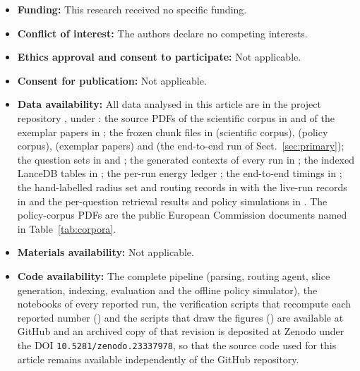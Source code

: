 \documentclass[pdflatex,sn-mathphys-num]{sn-jnl}
\theoremstyle{thmstyleone}%
\theoremstyle{thmstylethree}%
\begin{document}
\begin{itemize}
\item \textbf{Funding:} This research received no specific funding.
\item \textbf{Conflict of interest:} The authors declare no competing interests.
\item \textbf{Ethics approval and consent to participate:} Not applicable.
\item \textbf{Consent for publication:} Not applicable.
\item \textbf{Data availability:} All data analysed in this article are in the project repository \cite{sandor2025documentslicecontextualretrieval}, under : the source PDFs of the scientific corpus in  and of the exemplar papers in ; the frozen chunk files in  (scientific corpus),  (policy corpus),  (exemplar papers) and  (the end-to-end run of Sect.~\ref{sec:primary}); the question sets in  and ; the generated contexts of every run in ; the indexed LanceDB tables in ; the per-run energy ledger ; the end-to-end timings in ; the hand-labelled radius set and routing records in  with the live-run records in  and the per-question retrieval results and policy simulations in . The policy-corpus PDFs are the public European Commission documents named in Table~\ref{tab:corpora}.
\item \textbf{Materials availability:} Not applicable.
\item \textbf{Code availability:} The complete pipeline (parsing, routing agent, slice generation, indexing, evaluation and the offline policy simulator), the notebooks of every reported run, the verification scripts that recompute each reported number () and the scripts that draw the figures () are available at GitHub \cite{sandor2025documentslicecontextualretrieval} and an archived copy of that revision is deposited at Zenodo under the DOI \texttt{10.5281/zenodo.23337978}, so that the source code used for this article remains available independently of the GitHub repository.

\end{itemize}
\end{document}
